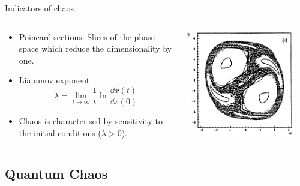 \documentclass[a4,compress]{beamer}
\begin{document}
\begin{frame}{Indicators of chaos}
  \begin{columns}[c]
  \begin{column}{0.6\textwidth}
    \begin{itemize}
      \item Poincaré sections: Slices of the phase space which reduce the
      dimensionality by one.
      \item Liapunov exponent
      \[
        \lambda = \lim\limits_{t \to \infty} \frac{1}{t} \ln{\frac{\dd{x}(t)}{\dd{x}(0)}}
      \]
      \item Chaos is characterised by sensitivity to the initial conditions
      (\(\lambda > 0\)).
    \end{itemize}
  \end{column}
  \begin{column}{0.4\textwidth}
    \includegraphics[width=0.9\textwidth]{ponicare-sections-e_120}
  \end{column}
  \end{columns}

\end{frame}

\subsection{Quantum Chaos}

\end{document}
